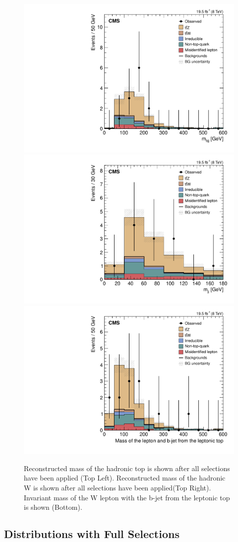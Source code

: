 \begin{figure}[h]
\begin{center}
\includegraphics[width=0.48\linewidth]{Figs/Plots_Final_Selections/hTopMass_3L2J2b.pdf}
\includegraphics[width=0.48\linewidth]{Figs/Plots_Final_Selections/hTopWMass_3L2J2b.pdf}
\includegraphics[width=0.48\linewidth]{Figs/Plots_Final_Selections/hTopbLMass_3L2J2b.pdf}
\caption{\label{fig:htopmass_3l2j2b}
Reconstructed mass of the hadronic top is shown after all selections have been applied (Top Left). Reconstructed mass of the hadronic W is shown after all selections have been applied(Top Right). Invariant mass of the W lepton with the b-jet from the leptonic top is shown (Bottom).
}
\end{center}
\end{figure}
	
	
	
	
	
	
	
	\subsection{Distributions with Full Selections}	
	
